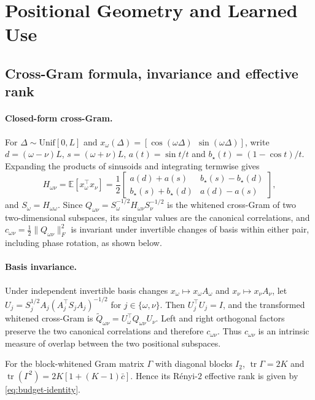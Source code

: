 \section{Positional Geometry and Learned Use}
\label{sec:compact-geometry}\label{sec:geometry-proofs}
\subsection{Cross-Gram formula, invariance and effective rank}
\paragraph{Closed-form cross-Gram.} For $\Delta\sim\mathrm{Unif}[0,L]$ and
$x_\omega(\Delta)=[\cos(\omega\Delta)\ \ \sin(\omega\Delta)]$, write
$d=(\omega{-}\nu)L$, $s=(\omega{+}\nu)L$, $a(t)=\sin t/t$ and
$b_\star(t)=(1{-}\cos t)/t$. Expanding the products of sinusoids and integrating
termwise gives
\begin{equation}
H_{\omega\nu}=\mathbb E[x_\omega^\top x_\nu]=\frac12
\begin{bmatrix}
a(d)+a(s) & b_\star(s)-b_\star(d)\\
b_\star(s)+b_\star(d) & a(d)-a(s)
\end{bmatrix},
\label{eq:cross-gram}
\end{equation}
and $S_\omega=H_{\omega\omega}$. Since $Q_{\omega\nu}=S_\omega^{-1/2}H_{\omega\nu}S_\nu^{-1/2}$
is the whitened cross-Gram of two two-dimensional subspaces, its singular values
are the canonical correlations, and $c_{\omega\nu}=\frac12\|Q_{\omega\nu}\|_F^2$
is invariant under invertible changes of basis within either pair,
including phase rotation, as shown below.

\paragraph{Basis invariance.}
Under independent invertible basis changes $x_\omega\mapsto x_\omega A_\omega$ and
$x_\nu\mapsto x_\nu A_\nu$, let
$U_j=S_j^{1/2}A_j(A_j^\top S_j A_j)^{-1/2}$ for $j\in\{\omega,\nu\}$. Then
$U_j^\top U_j=I$, and the transformed whitened cross-Gram is
$\widetilde Q_{\omega\nu}=U_\omega^\top Q_{\omega\nu}U_\nu$. Left and right
orthogonal factors preserve the two canonical correlations and therefore
$c_{\omega\nu}$. Thus $c_{\omega\nu}$ is an intrinsic measure of overlap
between the two positional subspaces.

\begin{theorem}
\label{thm:budget}
For the block-whitened Gram matrix $\Gamma$ with diagonal blocks $I_2$,
$\operatorname{tr}\Gamma=2K$ and
$\operatorname{tr}(\Gamma^2)=2K[1+(K-1)\bar c]$. Hence its
R\'enyi-$2$ effective rank is given by \eqref{eq:budget-identity}.
\end{theorem}

